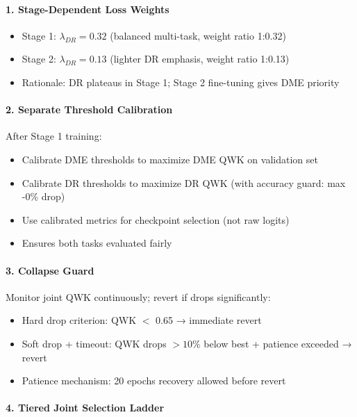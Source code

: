 \documentclass[12pt,a4paper]{article}
\begin{document}
\paragraph{1. Stage-Dependent Loss Weights}

\begin{itemize}
    \item Stage 1: $\lambda_{DR} = 0.32$ (balanced multi-task, weight ratio 1:0.32)
    \item Stage 2: $\lambda_{DR} = 0.13$ (lighter DR emphasis, weight ratio 1:0.13)
    \item Rationale: DR plateaus in Stage 1; Stage 2 fine-tuning gives DME priority
\end{itemize}

\paragraph{2. Separate Threshold Calibration}

After Stage 1 training:

\begin{itemize}
    \item Calibrate DME thresholds to maximize DME QWK on validation set
    \item Calibrate DR thresholds to maximize DR QWK (with accuracy guard: max -0\% drop)
    \item Use calibrated metrics for checkpoint selection (not raw logits)
    \item Ensures both tasks evaluated fairly
\end{itemize}

\paragraph{3. Collapse Guard}

Monitor joint QWK continuously; revert if drops significantly:

\begin{itemize}
    \item Hard drop criterion: QWK $<$ 0.65 → immediate revert
    \item Soft drop + timeout: QWK drops $> 10\%$ below best + patience exceeded → revert
    \item Patience mechanism: 20 epochs recovery allowed before revert
\end{itemize}

\paragraph{4. Tiered Joint Selection Ladder}
\end{document}
